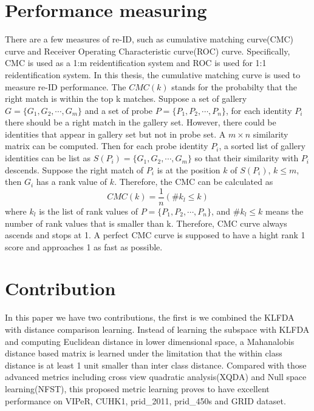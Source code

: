 \section{Performance measuring}

There are a few measures of re-ID, such as cumulative matching curve(CMC) curve and Receiver Operating Characteristic curve(ROC) curve. Specifically, CMC is used as a 1:m reidentification system and ROC is used for 1:1 reidentification system.  In this thesis, the cumulative matching curve is used to measure re-ID performance. The $CMC(k)$  stands for the probabilty that the right match is within the top k matches. Suppose a set of gallery $G = \{G_1,G_2,\cdots,G_m\}$ and a set of probe $P = \{P_1,P_2,\cdots,P_n\}$, for each identity $P_i$ there should be a right match in the gallery set. However, there could be identities that appear in gallery set but not in probe set. A $m\times n$ similarity matrix can be computed. Then for each probe identity $P_i$, a sorted list of gallery identities can be list as $S(P_i) = \{{G_{1},G_{2},\cdots,G_{m}}\}$ so that their similarity with $P_i$ descends. Suppose the right match of $P_i$ is at the position $k$ of $S(P_i)$, $k\le m$, then $G_i$ has a rank value of $k$. Therefore, the CMC can be calculated as 
\begin{equation}
CMC(k) = \frac{1}{n}(\#k_l\le k)
\end{equation}
where $k_l$ is the list of rank values of $P = \{P_1,P_2,\cdots,P_n\}$, and $\#k_l\le k$ means the number of rank values that is smaller than k.  Therefore, CMC curve always ascends and stops at 1.  A perfect CMC curve is supposed to have a hight rank 1 score and approaches 1 as fast as possible.




\section{Contribution}

In this paper we have two contributions, the first is we combined the KLFDA with distance comparison learning. Instead of learning the subspace with KLFDA and computing Euclidean distance in lower dimensional space, a Mahanalobis distance based matrix is learned under the limitation that the within class distance is at least 1 unit smaller than inter class distance. Compared with those advanced metrics including cross view quadratic analysis(XQDA) and Null space learning(NFST), this proposed metric learning proves to have excellent performance on VIPeR, CUHK1, prid\_2011, prid\_450s and GRID dataset.

